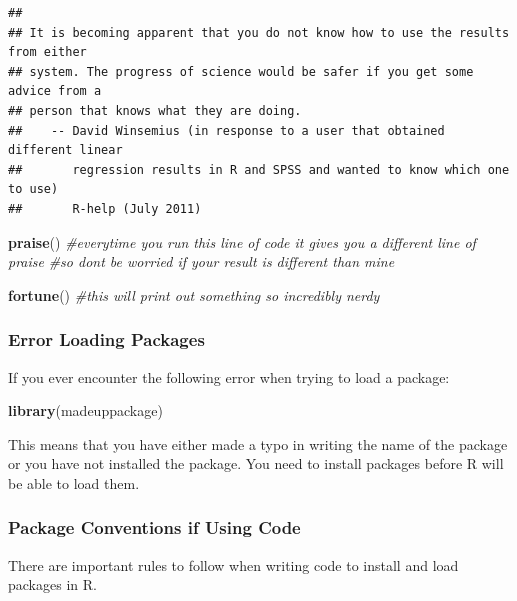 \documentclass[
]{book}
\newenvironment{Shaded}{\begin{snugshade}}{\end{snugshade}}
\newcommand{\CommentTok}[1]{\textcolor[rgb]{0.56,0.35,0.01}{\textit{#1}}}
\newcommand{\FunctionTok}[1]{\textcolor[rgb]{0.13,0.29,0.53}{\textbf{#1}}}
\newcommand{\NormalTok}[1]{#1}
\begin{document}
\begin{verbatim}
## 
## It is becoming apparent that you do not know how to use the results from either
## system. The progress of science would be safer if you get some advice from a
## person that knows what they are doing.
##    -- David Winsemius (in response to a user that obtained different linear
##       regression results in R and SPSS and wanted to know which one to use)
##       R-help (July 2011)
\end{verbatim}

\begin{Shaded}
\begin{Highlighting}[]
\FunctionTok{praise}\NormalTok{() }\CommentTok{\#everytime you run this line of code it gives you a different line of praise}
\CommentTok{\#so don\textquotesingle{}t be worried if your result is different than mine}

\FunctionTok{fortune}\NormalTok{() }\CommentTok{\#this will print out something so incredibly nerdy }
\end{Highlighting}
\end{Shaded}

\hypertarget{error-loading-packages}{%
\subsubsection{Error Loading Packages}\label{error-loading-packages}}

If you ever encounter the following error when trying to load a package:

\begin{Shaded}
\begin{Highlighting}[]
\FunctionTok{library}\NormalTok{(madeuppackage)}
\end{Highlighting}
\end{Shaded}

This means that you have either made a typo in writing the name of the package or you have not installed the package. You need to install packages before R will be able to load them.

\hypertarget{package-conventions-if-using-code}{%
\subsubsection{Package Conventions if Using Code}\label{package-conventions-if-using-code}}

There are important rules to follow when writing code to install and load packages in R.
\end{document}
